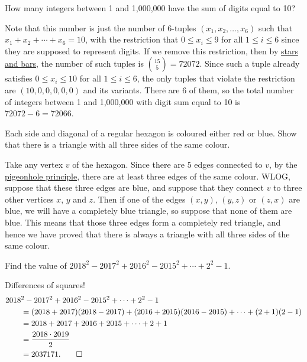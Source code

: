 \begin{question}
    How many integers between 1 and 1,000,000 have the sum of digits equal to 10?
\end{question}
\begin{solution}
    Note that this number is just the number of $6$-tuples $(x_1, x_2, \ldots,
    x_6)$ such that $x_1 + x_2 + \cdots + x_6 = 10$, with the restriction that
    $0 \leq x_i \leq 9$ for all $1 \leq i \leq 6$ since they are supposed to
    represent digits. If we remove this restriction, then by \hyperref[teq:
    starsandbars]{stars and bars}, the number of such tuples is $\binom{15}{5} =
    72072$. Since such a tuple already satisfies $0 \leq x_i \leq 10$ for all $1
    \leq i \leq 6$, the only tuples that violate the restriction are $(10, 0, 0,
    0, 0, 0)$ and its variants. There are 6 of them, so the total number of
    integers between 1 and 1,000,000 with digit sum equal to 10 is $72072 - 6 =
    72066$.
\end{solution}

\begin{question}
    Each side and diagonal of a regular hexagon is coloured either red or blue.
    Show that there is a triangle with all three sides of the same colour. 
\end{question}
\begin{solution}
    Take any vertex $v$ of the hexagon. Since there are 5 edges connected to
    $v$, by the \hyperref[thm: pigeonhole]{pigeonhole principle}, there are at
    least three edges of the same colour. WLOG, suppose that these three edges
    are blue, and suppose that they connect $v$ to three other vertices $x$,
    $y$ and $z$. Then if one of the edges $(x, y)$, $(y, z)$ or $(z, x)$ are
    blue, we will have a completely blue triangle, so suppose that none of them
    are blue. This means that those three edges form a completely red triangle,
    and hence we have proved that there is always a triangle with all three
    sides of the same colour.
\end{solution}

\begin{question}
    Find the value of $2018^2 - 2017^2 + 2016^2 - 2015^2 + \cdots + 2^2 - 1$.
\end{question}
\begin{solution} 
    Differences of squares!
    \begin{align*}
        \MoveEqLeft
    2018^2 - 2017^2 + 2016^2 - 2015^2 + \cdots + 2^2 - 1\\
        &= (2018 + 2017)(2018 - 2017) + (2016 + 2015)(2016 - 2015) + \cdots + (2 + 1)(2 - 1)\\
        &= 2018 + 2017 + 2016 + 2015 + \cdots + 2 + 1\\
        &= \frac{2018 \cdot 2019}{2}\\
        &= 2037171. \qedhere
    \end{align*}
\end{solution}
